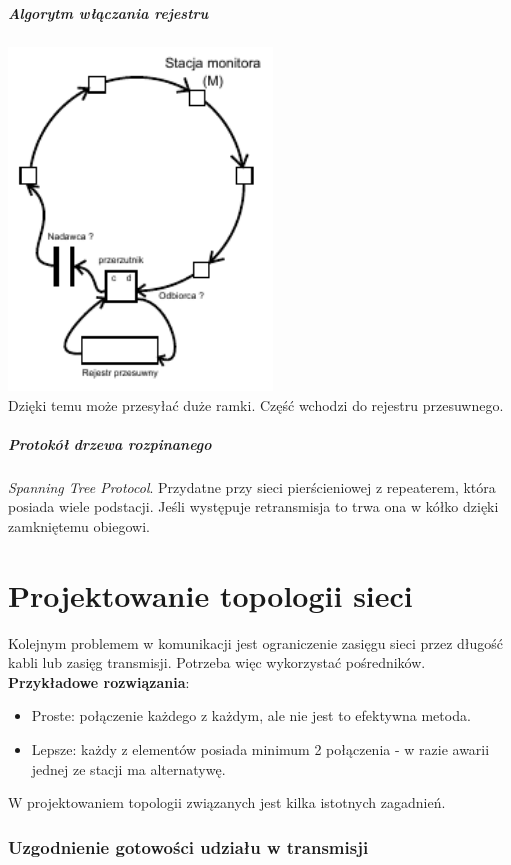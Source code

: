 \documentclass[a4paper,twoside]{article}
\begin{document}
			\subsubsection{Algorytm włączania rejestru}
				\includegraphics[width=7cm]{./images/image34.pdf}\\
				Dzięki temu może przesyłać duże ramki. Część wchodzi do rejestru przesuwnego.
			\subsubsection{Protokół drzewa rozpinanego}
				\emph{Spanning Tree Protocol}. Przydatne przy sieci pierścieniowej z repeaterem, która posiada wiele podstacji. Jeśli występuje retransmisja to trwa ona w kółko dzięki zamkniętemu obiegowi.


\part{Projektowanie topologii sieci}
	Kolejnym problemem w komunikacji jest ograniczenie zasięgu sieci przez długość kabli lub zasięg transmisji. Potrzeba więc wykorzystać pośredników.\\
	\textbf{Przykładowe rozwiązania}:
	\begin{itemize}
		\item Proste: połączenie każdego z każdym, ale nie jest to efektywna metoda.
		\item Lepsze: każdy z elementów posiada minimum 2 połączenia - w razie awarii jednej ze stacji ma alternatywę.
	\end{itemize}
	W projektowaniem topologii związanych jest kilka istotnych zagadnień.
	\section{Uzgodnienie gotowości udziału w transmisji}
\end{document}

